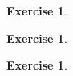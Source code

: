 \documentclass[answers]{exam}
\newtheorem{exercise}[theorem]{Exercise}
\theoremstyle{definition}
\theoremstyle{remark}
\begin{document}
\begin{exercise}
    
\end{exercise}
\begin{solution}
    
\end{solution}





\begin{exercise}
    
\end{exercise}
\begin{solution}
    
\end{solution}





\begin{exercise}
    
\end{exercise}
\begin{solution}
    
\end{solution}
\end{document}
